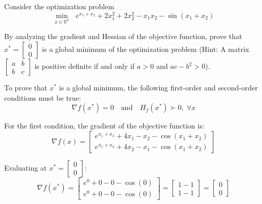 \begin{homeworkProblem}
    
    Consider the optimization problem
    \begin{equation}
        \min_{x \in \mathbb R^2} \ \ \ e^{x_1+x_2} + 2x_1^2 + 2x_2^2 - x_1x_2
        - \sin(x_1+x_2)
    \end{equation}

    By analyzing the gradient and Hessian of the objective function, prove that 
    $x^* = \left[ \begin{array}{c} 0 \\ 0 \end{array} \right]$ is a global 
    minimum of the optimization problem (Hint: A matrix $\left[ \begin{array}{cc} 
    a & b \\ b & c \end{array} \right]$ is positive definite if and only if 
    $a > 0$ and $ac - b^2 > 0$). 
        
    \begin{solution}[Proof]

        To prove that \(x^*\) is a global minimum, the following first-order and 
        second-order conditions must be true:
        \[
            \nabla f(x^*) = 0 \quad \text{and} \quad H_f(x^*) \succ 0, \; \forall x
        \]

        For the first condition, the gradient of the objective function is:
        \[
            \nabla f(x) = \left[ \begin{array}{c}
                e^{x_1 + x_2} + 4x_1 - x_2 - \cos(x_1 + x_2) \\
                e^{x_1 + x_2} + 4x_2 - x_1 - \cos(x_1 + x_2)
            \end{array} \right]
        \]

        Evaluating at \(x^* = \left[ \begin{array}{c} 0 \\ 0 \end{array} \right]\):
        \[
            \nabla f(x^*) = \left[ \begin{array}{c}
                e^0 + 0 - 0 - \cos(0) \\
                e^0 + 0 - 0 - \cos(0)
            \end{array} \right] = \left[ \begin{array}{c} 1 - 1 \\ 1 - 1 \end{array} \right] = \left[ \begin{array}{c} 0 \\ 0 \end{array} \right]
        \]


\end{solution}
\end{homeworkProblem}
